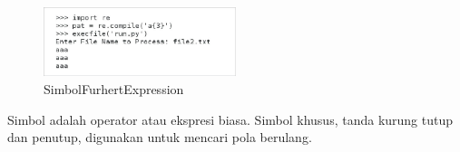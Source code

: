 \begin{figure}[ht]
	\centerline{\includegraphics[width=0.50\textwidth]{figures/SimbolFurhertExpression}}
	\caption{SimbolFurhertExpression}
	\label{SimbolFurhertExpression}
\end{figure}

\vspace{12pt}
\hspace*{0.5in}Simbol adalah operator atau ekspresi biasa. Simbol khusus, tanda kurung tutup dan penutup, digunakan untuk mencari pola berulang. 